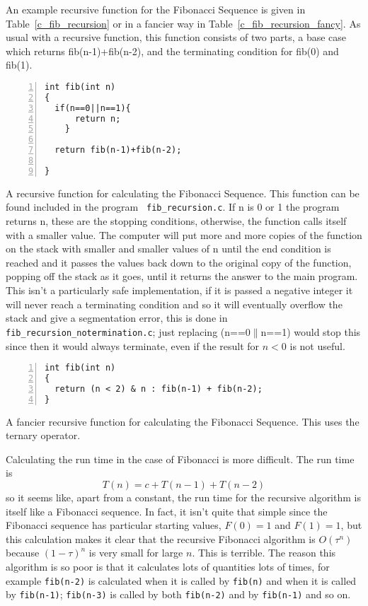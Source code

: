 \documentclass[11pt,a4paper]{scrartcl}
\begin{document}
An example recursive function for the Fibonacci Sequence is given in
Table~\ref{c_fib_recursion} or in a fancier way in
Table~\ref{c_fib_recursion_fancy}.  As usual with a recursive
function, this function consists of two parts, a base case which
returns fib(n-1)+fib(n-2), and the terminating condition for fib(0)
and fib(1).

\begin{table}
\begin{lstlisting}[numbers=left]
int fib(int n)
{
  if(n==0||n==1){
      return n;
    }

  return fib(n-1)+fib(n-2);

}
\end{lstlisting}
\caption{A recursive function for calculating the Fibonacci
  Sequence. This function can be found included in the program {\tt
    fib\_recursion.c}. If n is 0 or 1 the program returns n, these are
  the stopping conditions, otherwise, the function calls itself with a
  smaller value. The computer will put more and more copies of the
  function on the stack with smaller and smaller values of n until the
  end condition is reached and it passes the values back down to the
  original copy of the function, popping off the stack as it goes,
  until it returns the answer to the main program. This isn't a
  particularly safe implementation, if it is passed a negative integer
  it will never reach a terminating condition and so it will
  eventually overflow the stack and give a segmentation error, this is
  done in {\tt fib\_recursion\_no\-termination.c}; just replacing
  (n==0$\|$n==1) would stop this since then it would always terminate,
  even if the result for $n<0$ is not useful.\label{c_fib_recursion}}
\end{table}


\begin{table}
\begin{lstlisting}[numbers=left]
int fib(int n)
{
  return (n < 2) & n : fib(n-1) + fib(n-2); 
}
\end{lstlisting}
\caption{A fancier recursive function for calculating the Fibonacci Sequence. This uses the ternary operator. \label{c_fib_recursion_fancy}}
\end{table}

Calculating the run time in the case of Fibonacci is more
difficult. The run time is
\begin{equation}
T(n)=c+T(n-1)+T(n-2)
\end{equation}
so it seems like, apart from a constant, the run time for the
recursive algorithm is itself like a Fibonacci sequence. In fact, it
isn't quite that simple since the Fibonacci sequence has particular
starting values, $F(0)=1$ and $F(1)=1$, but this calculation makes it
clear that the recursive Fibonacci algorithm is $O(\tau^n)$ because
$(1-\tau)^n$ is very small for large $n$. This is terrible. The reason
this algorithm is so poor is that it calculates lots of quantities
lots of times, for example \texttt{fib(n-2)} is calculated when it is
called by \texttt{fib(n)} and when it is called by \texttt{fib(n-1)};
\texttt{fib(n-3)} is called by both \texttt{fib(n-2)} and by \texttt{fib(n-1)}
and so on.
\end{document}
